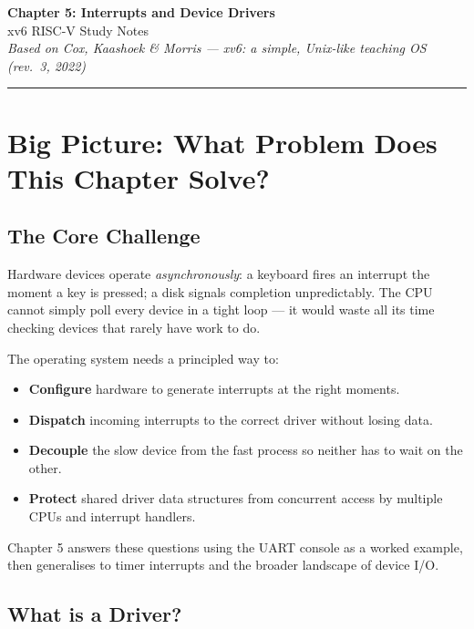 \documentclass[11pt, a4paper]{article}
\begin{document}
\begin{center}
  {\LARGE\bfseries\sffamily Chapter 5: Interrupts and Device Drivers}\\[0.4em]
  {\large\sffamily xv6 RISC-V Study Notes}\\[0.2em]
  {\small\itshape Based on Cox, Kaashoek \& Morris --- \emph{xv6: a simple, Unix-like teaching OS} (rev.\ 3, 2022)}
\end{center}

\vspace{0.5em}\hrule\vspace{1em}

\section{Big Picture: What Problem Does This Chapter Solve?}

\subsection{The Core Challenge}

Hardware devices operate \emph{asynchronously}: a keyboard fires an interrupt the moment a key is pressed; a disk signals completion unpredictably. The CPU cannot simply poll every device in a tight loop --- it would waste all its time checking devices that rarely have work to do.

The operating system needs a principled way to:
\begin{itemize}[leftmargin=1.5em]
  \item \textbf{Configure} hardware to generate interrupts at the right moments.
  \item \textbf{Dispatch} incoming interrupts to the correct driver without losing data.
  \item \textbf{Decouple} the slow device from the fast process so neither has to wait on the other.
  \item \textbf{Protect} shared driver data structures from concurrent access by multiple CPUs and interrupt handlers.
\end{itemize}

Chapter 5 answers these questions using the UART console as a worked example, then generalises to timer interrupts and the broader landscape of device I/O.

\subsection{What is a Driver?}
\end{document}
